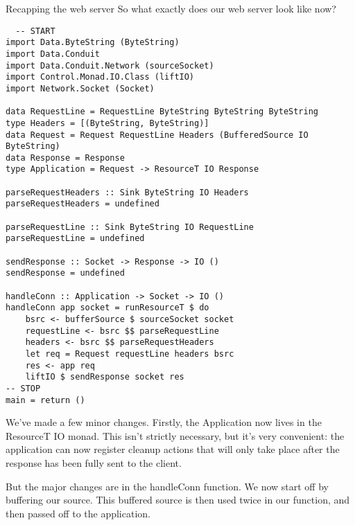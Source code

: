 Recapping the web server
So what exactly does our web server look like now?
\begin{lstlisting}
  -- START
import Data.ByteString (ByteString)
import Data.Conduit
import Data.Conduit.Network (sourceSocket)
import Control.Monad.IO.Class (liftIO)
import Network.Socket (Socket)

data RequestLine = RequestLine ByteString ByteString ByteString
type Headers = [(ByteString, ByteString)]
data Request = Request RequestLine Headers (BufferedSource IO ByteString)
data Response = Response
type Application = Request -> ResourceT IO Response

parseRequestHeaders :: Sink ByteString IO Headers
parseRequestHeaders = undefined

parseRequestLine :: Sink ByteString IO RequestLine
parseRequestLine = undefined

sendResponse :: Socket -> Response -> IO ()
sendResponse = undefined

handleConn :: Application -> Socket -> IO ()
handleConn app socket = runResourceT $ do
    bsrc <- bufferSource $ sourceSocket socket
    requestLine <- bsrc $$ parseRequestLine
    headers <- bsrc $$ parseRequestHeaders
    let req = Request requestLine headers bsrc
    res <- app req
    liftIO $ sendResponse socket res
-- STOP
main = return ()
\end{lstlisting}
We've made a few minor changes. Firstly, the Application now lives in the
ResourceT IO monad. This isn't strictly necessary, but it's very convenient:
the application can now register cleanup actions that will only take place after the
response has
been fully sent to the client.

But the major changes are in the handleConn function. We now start off by
buffering our source. This buffered source is then used twice in our function, and then
passed
off to the application.


